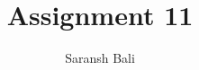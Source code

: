 \documentclass[journal,12pt,twocolumn]{IEEEtran}
\begin{document}
	\makeatletter
	\makeatother
	\let\StandardTheFigure\thefigure
	\let\vec\mathbf
	\renewcommand{\thefigure}{\theproblem}
	\def\putbox#1#2#3{\makebox[0in][l]{\makebox[#1][l]{}\raisebox{\baselineskip}[0in][0in]{\raisebox{#2}[0in][0in]{#3}}}}
	\def\rightbox#1{\makebox[0in][r]{#1}}
	\def\centbox#1{\makebox[0in]{#1}}
	\def\topbox#1{\raisebox{-\baselineskip}[0in][0in]{#1}}
	\def\midbox#1{\raisebox{-0.5\baselineskip}[0in][0in]{#1}}
	\vspace{3cm}
	\title{Assignment 11}
	\author{Saransh Bali}
\end{document}
